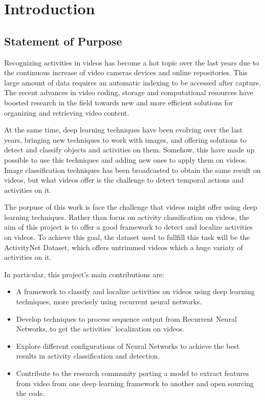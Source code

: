 \chapter{Introduction}

\section{Statement of Purpose}

Recognizing activities in videos has become a hot topic over the last years due to the continuous increase of video cameras devices and online repositories. This large amount of data requires an automatic indexing to be accessed after capture. The recent advances in video coding, storage and computational resources have boosted research in the field towards new and more efficient solutions for organizing and retrieving video content.

At the same time, deep learning techniques have been evolving over the last years, bringing new techniques to work with images, and offering solutions to detect and classify objects and activities on them. Somehow, this have made up possible to use this techniques and adding new ones to apply them on videos. Image classification techniques has been broadcasted to obtain the same result on videos, but what videos offer is the challenge to detect temporal actions and activities on it.

The porpuse of this work is face the challenge that videos might offer using deep learning techniques. Rather than focus on activity classification on videos, the aim of this project is to offer a good framework to detect and localize activities on videos. To achieve this goal, the dataset used to fullfill this task will be the ActivityNet Dataset, which offers untrimmed videos which a huge variaty of activities on it.

In particular, this project's main contributions are:
\begin{itemize}
    \item A framework to classify and localize activities on videos using deep learning techniques, more precisely using recurrent neural networks.
    \item Develop techniques to process sequence output from Recurrent Neural Networks, to get the activities' localization on videos.
    \item Explore different configurations of Neural Networks to achieve the best results in activity classification and detection.
    \item Contribute to the research community porting a model to extract features from video from one deep learning framework to another and open sourcing the code.
\end{itemize}

